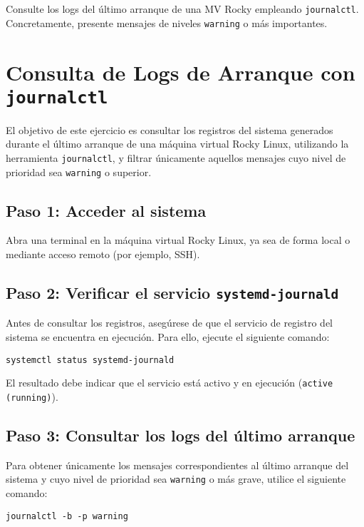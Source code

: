 Consulte los logs del último arranque de una MV Rocky empleando \texttt{journalctl}. Concretamente, presente mensajes de niveles \texttt{warning} o más importantes.

\section*{Consulta de Logs de Arranque con \texttt{journalctl}}

El objetivo de este ejercicio es consultar los registros del sistema generados durante el último arranque de una máquina virtual Rocky Linux, utilizando la herramienta \texttt{journalctl}, y filtrar únicamente aquellos mensajes cuyo nivel de prioridad sea \texttt{warning} o superior.

\subsection*{Paso 1: Acceder al sistema}

Abra una terminal en la máquina virtual Rocky Linux, ya sea de forma local o mediante acceso remoto (por ejemplo, SSH).

\subsection*{Paso 2: Verificar el servicio \texttt{systemd-journald}}

Antes de consultar los registros, asegúrese de que el servicio de registro del sistema se encuentra en ejecución. Para ello, ejecute el siguiente comando:

\begin{verbatim}
systemctl status systemd-journald
\end{verbatim}

El resultado debe indicar que el servicio está activo y en ejecución (\texttt{active (running)}).

\subsection*{Paso 3: Consultar los logs del último arranque}

Para obtener únicamente los mensajes correspondientes al último arranque del sistema y cuyo nivel de prioridad sea \texttt{warning} o más grave, utilice el siguiente comando:

\begin{verbatim}
journalctl -b -p warning
\end{verbatim}

